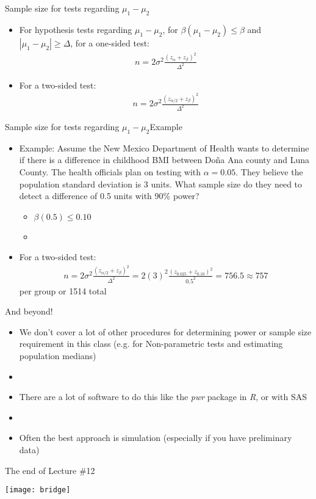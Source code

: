 \documentclass[xcolor=dvipsnames]{beamer}
\begin{document}
\begin{frame}{Sample size for tests regarding $\mu_1 - \mu_2$}
	\begin{itemize}
		\item For hypothesis tests regarding $\mu_1 - \mu_2$, for $\beta(\mu_1 - \mu_2) \leq \beta$ and $|\mu_1 - \mu_2|\geq \Delta$, for a one-sided test: \pause
		\begin{gather*}
			n = 2 \sigma^2 \frac{(z_{\alpha} + z_{\beta})^2}{\Delta^2}
		\end{gather*} \pause
		\item For a two-sided test: \pause
		\begin{gather*}
		n = 2 \sigma^2 \frac{(z_{\alpha/2} + z_{\beta})^2}{\Delta^2}
		\end{gather*}
	\end{itemize}
\end{frame}

\begin{frame}{Sample size for tests regarding $\mu_1 - \mu_2$}{Example}
	\begin{itemize}
		\item Example: Assume the New Mexico Department of Health wants to determine if there is a difference in childhood BMI between Do\~{n}a Ana county and Luna County. The health officials plan on testing with $\alpha = 0.05$. They believe the population standard deviation is 3 units. What sample size do they need to detect a difference of 0.5 units with 90\% power? \pause
		\begin{itemize}
			\item $\beta(0.5) \leq 0.10$
			\item[]
		\end{itemize} \pause
		\item For a two-sided test: \pause
		\begin{gather*}
		n = 2 \sigma^2 \frac{(z_{\alpha/2} + z_{\beta})^2}{\Delta^2} = 2 (3)^2 \frac{(z_{0.025} + z_{0.10})^2}{0.5^2} = 756.5 \approx 757
		\end{gather*}
		per group or 1514 total
	\end{itemize}
\end{frame}

\begin{frame}{And beyond!}
	\begin{itemize}
		\item We don't cover a lot of other procedures for determining power or sample size requirement in this class (e.g. for Non-parametric tests and estimating population medians) \pause
		\item[] 
		\item There are a lot of software to do this like the \emph{pwr} package in \emph{R}, or with SAS \pause
		\item[]
		\item Often the best approach is simulation (especially if you have preliminary data) 
	\end{itemize}
\end{frame}

\begin{frame}{The end of Lecture \#12}
	\begin{center}
		\texttt{[image: bridge]}
	\end{center}
\end{frame}
\end{document}
